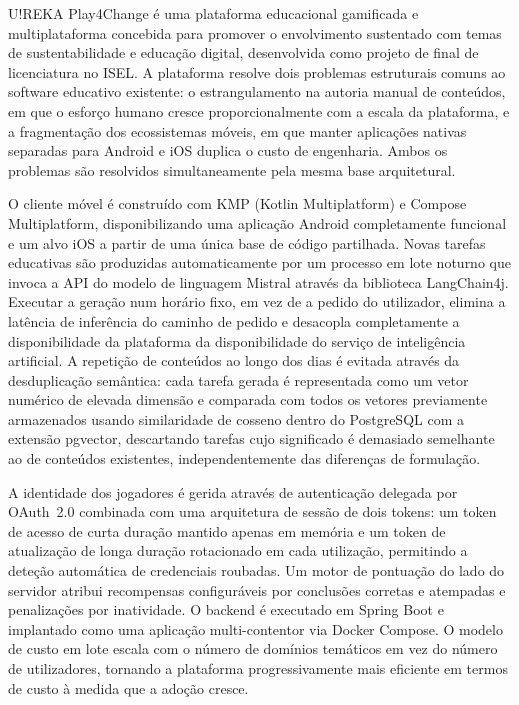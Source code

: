 \abstractPT  %

U!REKA Play4Change é uma plataforma educacional gamificada e multiplataforma concebida para promover o envolvimento sustentado com temas de sustentabilidade e educação digital, desenvolvida como projeto de final de licenciatura no ISEL. A plataforma resolve dois problemas estruturais comuns ao software educativo existente: o estrangulamento na autoria manual de conteúdos, em que o esforço humano cresce proporcionalmente com a escala da plataforma, e a fragmentação dos ecossistemas móveis, em que manter aplicações nativas separadas para Android e iOS duplica o custo de engenharia. Ambos os problemas são resolvidos simultaneamente pela mesma base arquitetural.

O cliente móvel é construído com KMP (Kotlin Multiplatform) e Compose Multiplatform, disponibilizando uma aplicação Android completamente funcional e um alvo iOS a partir de uma única base de código partilhada. Novas tarefas educativas são produzidas automaticamente por um processo em lote noturno que invoca a API do modelo de linguagem Mistral através da biblioteca LangChain4j. Executar a geração num horário fixo, em vez de a pedido do utilizador, elimina a latência de inferência do caminho de pedido e desacopla completamente a disponibilidade da plataforma da disponibilidade do serviço de inteligência artificial. A repetição de conteúdos ao longo dos dias é evitada através da desduplicação semântica: cada tarefa gerada é representada como um vetor numérico de elevada dimensão e comparada com todos os vetores previamente armazenados usando similaridade de cosseno dentro do PostgreSQL com a extensão pgvector, descartando tarefas cujo significado é demasiado semelhante ao de conteúdos existentes, independentemente das diferenças de formulação.

A identidade dos jogadores é gerida através de autenticação delegada por OAuth~2.0 combinada com uma arquitetura de sessão de dois tokens: um token de acesso de curta duração mantido apenas em memória e um token de atualização de longa duração rotacionado em cada utilização, permitindo a deteção automática de credenciais roubadas. Um motor de pontuação do lado do servidor atribui recompensas configuráveis por conclusões corretas e atempadas e penalizações por inatividade. O backend é executado em Spring Boot e implantado como uma aplicação multi-contentor via Docker Compose. O modelo de custo em lote escala com o número de domínios temáticos em vez do número de utilizadores, tornando a plataforma progressivamente mais eficiente em termos de custo à medida que a adoção cresce.
